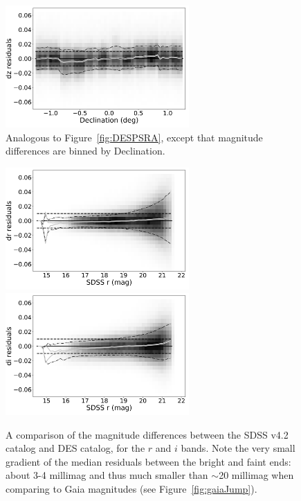 \documentclass[fleqn,usenatbib]{mnras}
\begin{document}
\begin{figure}[th!]
    \centering\includegraphics[width=7cm]{figures/colorResidPSDR2v42bright_dz_Dec_Hess.png}
\caption{Analogous to Figure~\ref{fig:DESPSRA}, except that magnitude differences
are binned by Declination.}
\label{fig:DESPSDec}
\end{figure}

\begin{figure}[th!]
    \centering\includegraphics[width=7cm]{figures/colorResidDES42_dr_rmag_Hess.png}
    \centering\includegraphics[width=7cm]{figures/colorResidDES42_di_rmag_Hess.png} 
\caption{A comparison of the magnitude differences between the SDSS v4.2 catalog
and DES catalog, for the $r$ and $i$ bands. Note the very small gradient of the median
residuals between the bright and faint ends: about 3-4 millimag and thus much smaller
than $\sim$20 millimag when comparing to Gaia magnitudes (see Figure~\ref{fig:gaiaJump}).} 
\label{fig:drVSr}
\end{figure}

\end{document}
